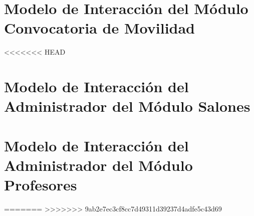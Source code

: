 \section{Modelo de Interacción del Módulo Convocatoria de Movilidad}

<<<<<<< HEAD

\section{Modelo de Interacción del Administrador del Módulo Salones}

\section{Modelo de Interacción del Administrador del Módulo Profesores}
=======
>>>>>>> 9ab2e7ec3cf8cc7d49311d39237d4adfe5c43d69
